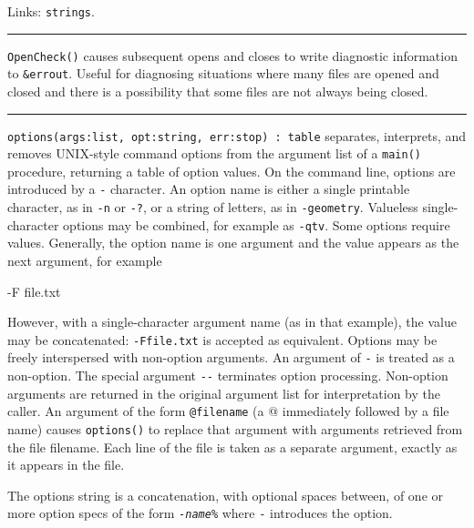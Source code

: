 Links: \texttt{strings}.

\vspace{0.25cm}\hrule{}

\texttt{OpenCheck()} causes subsequent opens and closes to write
diagnostic information to \texttt{\&errout}. Useful for diagnosing
situations where many files are opened and closed and there is a
possibility that some files are not always being closed.

\vspace{0.25cm}\hrule{}

\texttt{options(args:list, opt:string, err:stop) : table} separates,
interprets, and removes UNIX-style command
options from the argument list of a \texttt{main()} procedure,
returning a table of option values. On the command line, options are
introduced by a \texttt{{\textquotedbl}-{\textquotedbl}} character. An
option name is either a single printable character, as in
\texttt{{\textquotedbl}-n{\textquotedbl}} or
\texttt{{\textquotedbl}-?{\textquotedbl}}, or a string of letters, as
in \texttt{{\textquotedbl}-geometry{\textquotedbl}}. Valueless
single-character options may be combined, for example as
\texttt{{\textquotedbl}-qtv{\textquotedbl}}. Some options require
values. Generally, the option name is one argument and the value
appears as the next argument, for example

{\ttfamily
{\textquotedbl}-F file.txt{\textquotedbl}}

However, with a single-character argument name (as in that example), the
value may be concatenated:
\texttt{{\textquotedbl}-Ffile.txt{\textquotedbl}} is accepted as
equivalent. Options may be freely interspersed with non-option
arguments. An argument of \texttt{{\textquotedbl}-{\textquotedbl}} is
treated as a non-option. The special argument
\texttt{{\textquotedbl}-{}-{\textquotedbl}} terminates option
processing. Non-option arguments are returned in the original argument
list for interpretation by the caller. An argument of the form
\texttt{@filename} (a {\textquotedbl}@{\textquotedbl} immediately
followed by a file name) causes \texttt{options()} to replace that
argument with arguments retrieved from the file
{\textquotedbl}filename{\textquotedbl}. Each line of the file is taken
as a separate argument, exactly as it appears in the file.

The options string is a concatenation, with optional spaces between, of
one or more option specs of the form
\texttt{{}-}\texttt{\textit{name}}\texttt{\%} where \texttt{{}-}
introduces the option.

